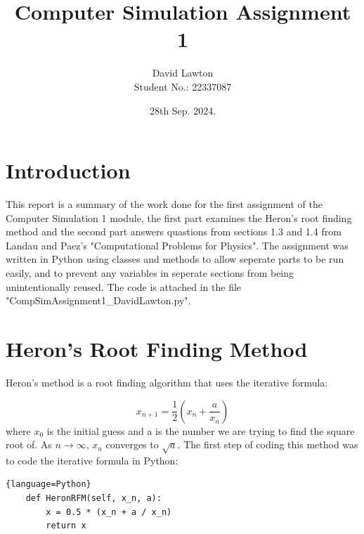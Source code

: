 \documentclass{article}
\title{Computer Simulation Assignment 1}
\author{David Lawton\\ Student No.: 22337087}
\date{28th Sep. 2024.}
\theoremstyle{definition}
\theoremstyle{remark}
\begin{document}
\maketitle

\tableofcontents


\section{Introduction}
This report is a summary of the work done for the first assignment of the Computer Simulation 1 module, the first part examines the Heron's root finding method and the second part answers quastions from sections 1.3 and 1.4 from Landau and Paez's "Computational Problems for Physics". The assignment was written in Python using classes and methods to allow seperate parts to be run easily, and to prevent any variables in seperate sections from being unintentionally reused. The code is attached in the file "CompSimAssignment1\_DavidLawton.py".

\section{Heron's Root Finding Method}

Heron's method is a root finding algorithm that uses the iterative formula:

\begin{equation}
    x_{n+1} = \frac{1}{2} \left( x_n + \frac{a}{x_n} \right)
\end{equation}
where $x_0$ is the initial guess and a is the number we are trying to find the square root of. As $n\rightarrow\infty$, $x_n$ converges to $\sqrt{a}$. The first step of coding this method was to code the iterative formula in Python:
\begin{lstlisting}{language=Python}
    def HeronRFM(self, x_n, a):
        x = 0.5 * (x_n + a / x_n)
        return x
\end{lstlisting}
\end{document}
